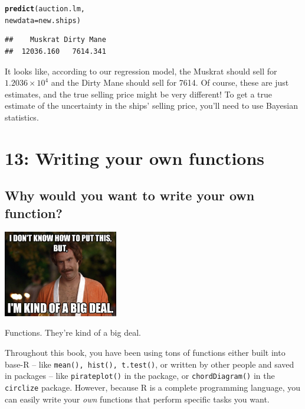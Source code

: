 \documentclass{tufte-book}\usepackage[]{graphicx}\usepackage[]{color}
\makeatletter
\newcommand{\hlstd}[1]{\textcolor[rgb]{0.345,0.345,0.345}{#1}}%
\newcommand{\hlkwc}[1]{\textcolor[rgb]{0.333,0.667,0.333}{#1}}%
\newcommand{\hlkwd}[1]{\textcolor[rgb]{0.737,0.353,0.396}{\textbf{#1}}}%
\newenvironment{kframe}{%
 \def\at@end@of@kframe{}%
 \ifinner\ifhmode%
  \def\at@end@of@kframe{\end{minipage}}%
  \begin{minipage}{\columnwidth}%
 \fi\fi%
 \def\FrameCommand##1{\hskip\@totalleftmargin \hskip-\fboxsep
 \colorbox{shadecolor}{##1}\hskip-\fboxsep
     \hskip-\linewidth \hskip-\@totalleftmargin \hskip\columnwidth}%
 \MakeFramed {\advance\hsize-\width
   \@totalleftmargin\z@ \linewidth\hsize
   \@setminipage}}%
 {\par\unskip\endMakeFramed%
 \at@end@of@kframe}
\newenvironment{knitrout}{}{} %
\makeatother
\begin{document}
\begin{knitrout}
\color{fgcolor}\begin{kframe}
\begin{alltt}
\hlkwd{predict}\hlstd{(auction.lm,}
        \hlkwc{newdata} \hlstd{= new.ships)}
\end{alltt}
\begin{verbatim}
##    Muskrat Dirty Mane 
##  12036.160   7614.341
\end{verbatim}
\end{kframe}
\end{knitrout}

It looks like, according to our regression model, the Muskrat should sell for \ensuremath{1.2036\times 10^{4}} and the Dirty Mane should sell for 7614. Of course, these are just estimates, and the true selling price might be very different! To get a true estimate of the uncertainty in the ships' selling price, you'll need to use Bayesian statistics.


\chapter{13: Writing your own functions}
\label{ch:13}

\section{Why would you want to write your own function?}

\begin{marginfigure}
\includegraphics[width=5cm]{bigdeal.jpg}
\caption{Functions. They're kind of a big deal.}
\end{marginfigure}


Throughout this book, you have been using tons of functions either built into base-R -- like \texttt{mean(), hist(), t.test()}, or written by other people and saved in packages -- like \texttt{pirateplot()} in the  package, or \texttt{chordDiagram()} in the \texttt{circlize} package. However, because R is a complete programming language, you can easily write your \textit{own} functions that perform specific tasks you want.
\end{document}
